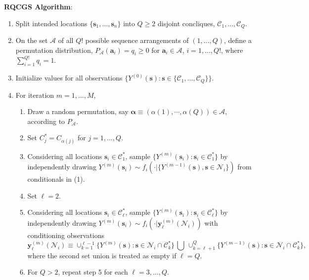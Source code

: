 \documentclass[12pt]{article}
\providecommand{\tightlist}{%
  \setlength{\itemsep}{0pt}\setlength{\parskip}{0pt}}
\theoremstyle{definition}
\begin{document}
\noindent \textbf{RQCGS Algorithm}: \vspace*{-.2cm}
\begin{enumerate}
\def\labelenumi{\Alph{enumi}.}
\tightlist
\item
  Split intended locations $\{\boldsymbol s_1,\ldots, \boldsymbol s_n\}$ into \(Q \geq 2\) disjoint concliques,
  \(\mathcal{C}_1,\ldots,\mathcal{C}_Q\).
\
  \item On the set $\mathcal{A}$ of all $Q!$ possible sequence arrangements  of $(1,\ldots,Q)$, define a
   permutation distribution, $P_\mathcal{A}(\boldsymbol a_i) =q_i \geq 0$ for $\boldsymbol a_i \in\mathcal{A}$, $i=1,\ldots,Q!$,  where $\sum_{i=1}^{Q!}q_i=1$.

  \item
  Initialize  values for all observations
  \(\{Y^{(0)}(\boldsymbol s): \boldsymbol s \in \{\mathcal{C}_1, \dots, \mathcal{C}_Q\}\}\).
\item
  For iteration \(m = 1, \dots, M\),
  \begin{enumerate}
  \def\labelenumii{\arabic{enumii}.}
  \tightlist

  \item Draw a random permutation, say $\boldsymbol  \alpha\equiv (\alpha(1),\cdots,\alpha(Q)) \in\mathcal{A}$,
   according to $P_\mathcal{A}$.
   \item Set $C^*_j = C_{\alpha(j)}$ for $j=1,\ldots,Q$.
  \item
    Considering all locations \(\boldsymbol s_i \in \mathcal{C}_1^*\),
    sample
    \(\{Y^{(m)}(\boldsymbol s_i) : \boldsymbol s_i \in \mathcal{C}_1^* \}\)
    by independently drawing
    \(Y^{(m)}(\boldsymbol s_i) \sim f_i(\cdot|\{Y^{(m-1)}(\boldsymbol s), \boldsymbol s \in \mathcal{N}_i\})\)
    from conditionals in (1).
  \item
    Set \(\ell =2\).
    \item Considering all locations
    \(\boldsymbol s_i \in \mathcal{C}^*_\ell\), sample
    \(\{Y^{(m)}(\boldsymbol s_i): \boldsymbol s_i \in \mathcal{C}^*_\ell\}\)
    by independently drawing
    \(Y^{(m)}(\boldsymbol s_i) \sim f_i(\cdot|\boldsymbol y_\ell^{(m)}(\mathcal{N}_i))\)
    with conditioning observations
    \[\boldsymbol y_\ell^{(m)}(\mathcal{N}_i) \equiv \cup_{k=1}^{\ell-1} \{ Y^{(m)}(\boldsymbol s):\boldsymbol s \in \mathcal{N}_i \cap \mathcal{C}^*_k\}\, \bigcup \,\cup_{k=\ell+1}^{Q} \{ Y^{(m-1)}(\boldsymbol s):\boldsymbol s \in \mathcal{N}_i \cap \mathcal{C}^*_k \},\]
    where the second set union is treated as empty if \(\ell=Q\).
  \item
    For \(Q>2\), repeat step 5 for each \(\ell=3,\ldots,Q\).\\
  \end{enumerate}
\end{enumerate}
\end{document}
